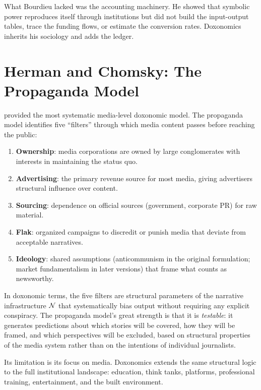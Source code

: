 What Bourdieu lacked was the accounting machinery.
He showed that symbolic power reproduces itself through institutions but did not build the input-output tables, trace the funding flows, or estimate the conversion rates.
Doxonomics inherits his sociology and adds the ledger.


\section{Herman and Chomsky: The Propaganda Model}
\label{sec:ch3-herman-chomsky}

\textcite{herman1988} provided the most systematic media-level doxonomic model.
The propaganda model identifies five ``filters'' through which media content passes before reaching the public:

\begin{enumerate}[nosep]
  \item \textbf{Ownership}: media corporations are owned by large conglomerates with interests in maintaining the status quo.
  \item \textbf{Advertising}: the primary revenue source for most media, giving advertisers structural influence over content.
  \item \textbf{Sourcing}: dependence on official sources (government, corporate PR) for raw material.
  \item \textbf{Flak}: organized campaigns to discredit or punish media that deviate from acceptable narratives.
  \item \textbf{Ideology}: shared assumptions (anticommunism in the original formulation; market fundamentalism in later versions) that frame what counts as newsworthy.
\end{enumerate}

In doxonomic terms, the five filters are structural parameters of the narrative infrastructure $\mathcal{N}$ that systematically bias output without requiring any explicit conspiracy.
The propaganda model's great strength is that it is \emph{testable}: it generates predictions about which stories will be covered, how they will be framed, and which perspectives will be excluded, based on structural properties of the media system rather than on the intentions of individual journalists.

Its limitation is its focus on media.
Doxonomics extends the same structural logic to the full institutional landscape: education, think tanks, platforms, professional training, entertainment, and the built environment.


